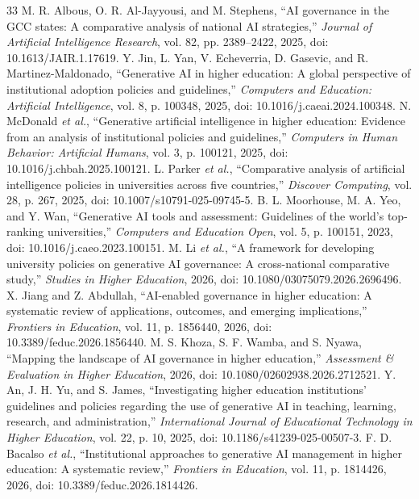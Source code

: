 \documentclass[conference,letterpaper]{IEEEtran}
\begin{document}
\begin{thebibliography}{33}\footnotesize
{} M. R. Albous, O. R. Al-Jayyousi, and M. Stephens, ``AI governance in the GCC states: A comparative analysis of national AI strategies,'' \emph{Journal of Artificial Intelligence Research}, vol. 82, pp. 2389--2422, 2025, doi: 10.1613/JAIR.1.17619.
 Y. Jin, L. Yan, V. Echeverria, D. Gasevic, and R. Martinez-Maldonado, ``Generative AI in higher education: A global perspective of institutional adoption policies and guidelines,'' \emph{Computers and Education: Artificial Intelligence}, vol. 8, p. 100348, 2025, doi: 10.1016/j.caeai.2024.100348.
 N. McDonald \emph{et al.}, ``Generative artificial intelligence in higher education: Evidence from an analysis of institutional policies and guidelines,'' \emph{Computers in Human Behavior: Artificial Humans}, vol. 3, p. 100121, 2025, doi: 10.1016/j.chbah.2025.100121.
 L. Parker \emph{et al.}, ``Comparative analysis of artificial intelligence policies in universities across five countries,'' \emph{Discover Computing}, vol. 28, p. 267, 2025, doi: 10.1007/s10791-025-09745-5.
 B. L. Moorhouse, M. A. Yeo, and Y. Wan, ``Generative AI tools and assessment: Guidelines of the world's top-ranking universities,'' \emph{Computers and Education Open}, vol. 5, p. 100151, 2023, doi: 10.1016/j.caeo.2023.100151.
 M. Li \emph{et al.}, ``A framework for developing university policies on generative AI governance: A cross-national comparative study,'' \emph{Studies in Higher Education}, 2026, doi: 10.1080/03075079.2026.2696496.
 X. Jiang and Z. Abdullah, ``AI-enabled governance in higher education: A systematic review of applications, outcomes, and emerging implications,'' \emph{Frontiers in Education}, vol. 11, p. 1856440, 2026, doi: 10.3389/feduc.2026.1856440.
 M. S. Khoza, S. F. Wamba, and S. Nyawa, ``Mapping the landscape of AI governance in higher education,'' \emph{Assessment \& Evaluation in Higher Education}, 2026, doi: 10.1080/02602938.2026.2712521.
 Y. An, J. H. Yu, and S. James, ``Investigating higher education institutions' guidelines and policies regarding the use of generative AI in teaching, learning, research, and administration,'' \emph{International Journal of Educational Technology in Higher Education}, vol. 22, p. 10, 2025, doi: 10.1186/s41239-025-00507-3.
 F. D. Bacalso \emph{et al.}, ``Institutional approaches to generative AI management in higher education: A systematic review,'' \emph{Frontiers in Education}, vol. 11, p. 1814426, 2026, doi: 10.3389/feduc.2026.1814426.

\end{thebibliography}
\end{document}
